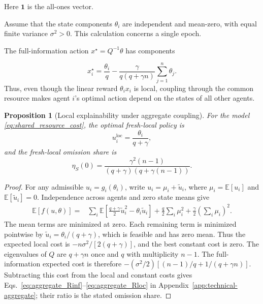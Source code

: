 \documentclass[11pt]{article}
\newtheorem{proposition}{Proposition}
\begin{document}
Here $\mathbf1$ is the all-ones vector.

Assume that the state components $\theta_i$ are independent and mean-zero,
with equal finite variance $\sigma^2>0$. This calculation concerns a single epoch.

The full-information action $x^\star=Q^{-1}\theta$ has components

\begin{equation}
    x_i^\star
    =
    \frac{\theta_i}{q}
    -
    \frac{\gamma}
    {q(q+\gamma n)}
    \sum_{j=1}^{n}\theta_j.
    \label{eq:shared_resource_xstar}
\end{equation}
Thus, even though the linear reward $\theta_i x_i$ is local, coupling through
the common resource makes agent $i$'s optimal action depend on the states of
all other agents.

\begin{proposition}[Local explainability under aggregate coupling]
\label{prop:aggregate_local}
For the model \eqref{eq:shared_resource_cost}, the optimal fresh-local policy
is
\begin{equation}
    u_i^{\mathrm{loc}}
    =
    \frac{\theta_i}{q+\gamma},
    \label{eq:optimal_local_shared}
\end{equation}
and the fresh-local omission share is
\begin{equation}
    \boxed{
    \eta_S(0)
    =
    \frac{
        \gamma^2(n-1)
    }{
        (q+\gamma)
        \left(
            q+\gamma(n-1)
        \right)
    }.
    }
    \label{eq:aggregate_eta}
\end{equation}
\end{proposition}

\begin{proof}
For any admissible $u_i=g_i(\theta_i)$, write
$u_i=\mu_i+\widetilde u_i$, where $\mu_i=\mathbb E[u_i]$ and
$\mathbb E[\widetilde u_i]=0$. Independence across agents and zero state
means give
\begin{align}
\mathbb E[f(u,\theta)]={}&
\sum_i\mathbb E\left[\frac{q+\gamma}{2}\widetilde u_i^2
-\theta_i\widetilde u_i\right]
+\frac q2\sum_i\mu_i^2+\frac\gamma2\left(\sum_i\mu_i\right)^2.
\label{eq:aggregate_centered_cost}
\end{align}
The mean terms are minimized at zero. Each remaining term is minimized
pointwise by $\widetilde u_i=\theta_i/(q+\gamma)$, which is feasible and
has zero mean. Thus the expected local cost is
$-n\sigma^2/[2(q+\gamma)]$, and the best constant cost is zero.
The eigenvalues of $Q$ are $q+\gamma n$ once and $q$ with multiplicity
$n-1$. The full-information expected cost is therefore
$-(\sigma^2/2)[(n-1)/q+1/(q+\gamma n)]$.
Subtracting this cost from the local and constant costs gives
Eqs.~\eqref{eq:aggregate_Rinf}--\eqref{eq:aggregate_Rloc} in
Appendix~\ref{app:technical-aggregate}; their ratio is the stated omission share.
\end{proof}
\end{document}
